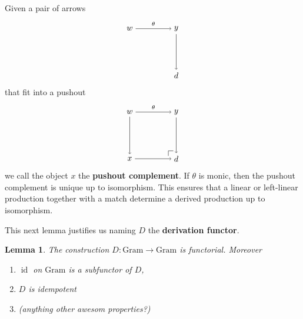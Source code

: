 \documentclass{amsart}
\newcommand{\Gram}{\cat{Gram}}
\newcommand{\defn}[1]{\textbf{#1}}
\newcommand{\cat}[1]{\mathrm{#1}}
\newcommand{\edit}[1]{\textcolor{editcolour}{(#1)}}
\newcommand{\from}{\colon}
\DeclareMathOperator{\id}{id}
\newtheorem{lemma}[theorem]{Lemma}
\theoremstyle{remark}
\theoremstyle{definition}
\begin{document}
Given a pair of arrows
\[
  \begin{tikzpicture}
    \node (1) at (-1,1) {\( w \)};
    \node (3) at (1,1) {\( y \)};
    \node (4) at (1,-1) {\( d \)};
    \draw [->] (1) to node [above] {\scriptsize{\( \theta \)}} (3);
    \draw [->] (3) to node [right] {\scriptsize{\(  \)}} (4);
  \end{tikzpicture}
\]
that fit into a pushout
\[
  \begin{tikzpicture}
    \node (1) at (-1,1) {\( w \)};
    \node (2) at (-1,-1) {\( x \)};
    \node (3) at (1,1) {\( y \)};
    \node (4) at (1,-1) {\( d \)};
    \draw [->] (1) to node [left] {\scriptsize{\(  \)}} (2);
    \draw [->] (1) to node [above] {\scriptsize{\( \theta \)}} (3);
    \draw [->] (2) to node [above] {\scriptsize{\(  \)}} (4);
    \draw [->] (3) to node [right] {\scriptsize{\(  \)}} (4);
    \node (a) at (0.66,-1) {};
    \node (b) at (0.66,-0.66) {};
    \node (c) at (1,-0.66) {};
    \draw (a) -- (b.center);
    \draw (b.center) -- (c);
  \end{tikzpicture}
\]
we call the object $ x $ the \defn{pushout complement}. If $ \theta $
is monic, then the pushout complement is unique up to isomorphism.
%
%
This ensures that a linear or left-linear production together with a
match determine a derived production up to isomorphism. 

This next lemma justifies us naming $ D $ the \defn{derivation
  functor}.

\begin{lemma}
  The construction $ D \from \Gram \to \Gram $ is functorial.
  Moreover
  \begin{enumerate}
  \item $ \id $ on $ \Gram $ is a subfunctor of $ D $,
  \item $ D $ is idempotent
  \item \edit{anything other awesom properties?}
  \end{enumerate}
\end{lemma}
\end{document}

